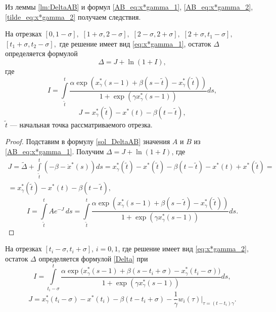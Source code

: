 Из леммы \eqref{lm:DeltaAB} и формул \eqref{AB_eq:x*gamma_1}, \eqref{AB_eq:x*gamma_2}, \eqref{tilde_eq:x*gamma_2} получаем следствия.
\begin{corollary}\label{corol_Delta_long}
На отрезках $[0, 1 - \sigma],$ $[1 + \sigma, 2 - \sigma],$ $[2 - \sigma, 2 + \sigma],$ $[2 + \sigma, t_1 - \sigma],$ $[t_1 + \sigma,t_2 - \sigma],$ где решение имеет вид \eqref{eq:x*gamma_1}, остаток $\Delta$ определяется формулой
\begin{equation}
    \label{Delta}
    \Delta = J + \ln(1 + I),
\end{equation}
где 
\begin{equation}
    \label{I_long}
    I = \int\limits_{\tilde{t}}^{t}\frac{\alpha\exp(x_{\gamma}^*(s-1)+\beta(s-\tilde{t})-x_{\gamma}^*(\tilde{t}))}{1 + \exp(\gamma x_{\gamma}^*(s-1))} ds,
\end{equation}
%
\begin{equation}\label{eq:J_long}
    J = x_{\gamma}^*(\tilde{t}) - x^*(t) - \beta(t - \tilde{t}),
\end{equation}
%
$\tilde{t}$ --- начальная точка рассматриваемого отрезка.
\end{corollary}
%
\begin{proof}
	Подставим в формулу \eqref{sol_DeltaAB} значения $A$ и $B$ из \eqref{AB_eq:x*gamma_1}. Получим $\Delta = J + \ln(1 + I)$, где
\begin{multline*}
	J = \tilde{\Delta} + \int\limits_{\tilde{t}}^{t}(-\beta - \dot{x}^*(s))ds = x_{\gamma}^*(\tilde{t}) - x^*(\tilde{t}) - \beta(t - \tilde{t}) - x^*(t) + x^*(\tilde{t}) =\\= x_{\gamma}^*(\tilde{t}) - x^*(t) - \beta(t - \tilde{t}),
\end{multline*}
\[
	I = \int\limits_{\tilde{t}}^{t} A e^{-J} \, ds = \int\limits_{\tilde{t}}^{t}\frac{\alpha\exp(x_{\gamma}^*(s-1)+\beta(s-\tilde{t})-x_{\gamma}^*(\tilde{t}))}{1 + \exp(\gamma x_{\gamma}^*(s-1))} ds.
\]
\end{proof}
%
\begin{corollary}\label{corol_Delta_short}
На отрезках $[t_i - \sigma, t_i + \sigma]$, $i=0, 1$, где решение имеет вид \eqref{eq:x*gamma_2}, остаток $\Delta$ определяется формулой \eqref{Delta} при
 \begin{equation}
    \label{I_point}
   I=\int\limits_{t_i-\sigma}^{t}\frac{\alpha\exp\big(x_{\gamma}^*(s-1)+\beta(s-t_i+\sigma)-x_{\gamma}^*(t_i-\sigma)\big)}{1+\exp(\gamma x_{\gamma}^*(s-1))}ds,
\end{equation}
%
\begin{equation}
    \label{J_point}
    J=x_{\gamma}^*(t_i - \sigma) - x^*(t_i) - \beta(t-t_i+\sigma) - \frac{1}{\gamma} w_i(\tau)|_{\tau=(t-t_i)\gamma}.
\end{equation}
\end{corollary}
